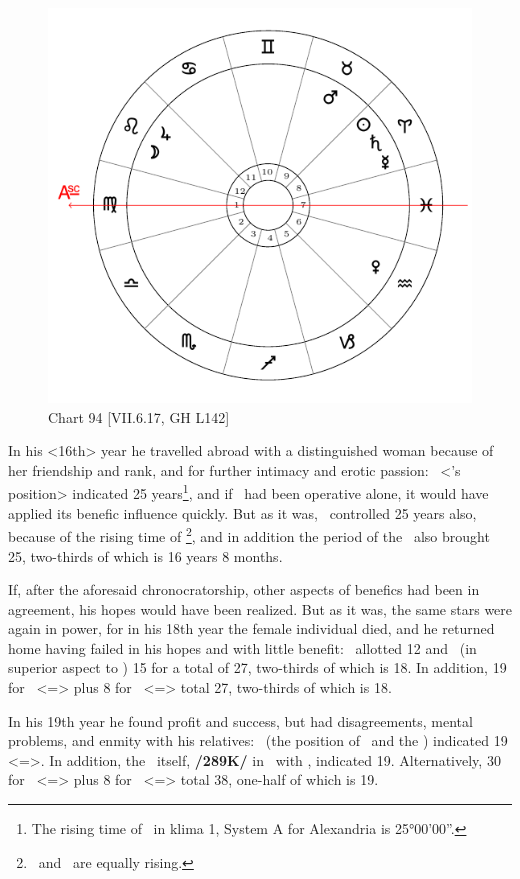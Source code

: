 \begin{figure}
\centering
\vspace{-20pt}
\includegraphics[width=.68\textwidth]{charts/7_6_17}
\caption{Chart 94 [VII.6.17, GH L142] }
\label{fig:chart94}
\end{figure} 

In his <16th> year he travelled abroad with a distinguished
woman because of her friendship and rank, and for further intimacy and erotic passion: \Aquarius\, <\Venus’s position> indicated 25 years\footnote{The rising time of \Aquarius\, in klima 1, System A for Alexandria is 25°00'00''.}, and if \Venus\, had been operative alone, it would have applied its benefic influence quickly. But as it was, \Mars\, controlled 25 years also, because of the rising time of \Taurus\footnote{\Taurus\, and \Aquarius\, are equally rising.}, and in addition the period of the \Moon\, also brought 25, two-thirds of which is 16 years 8 months. 

If, after the aforesaid chronocratorship, other aspects of benefics had been in agreement, his hopes would have been realized. But as it was, the same stars were again in power, for in his 18th year the female individual died, and he returned home having failed in his hopes and with little benefit: \Jupiter\, allotted 12 and \Mars\, (in superior aspect to \Jupiter) 15 for a total of 27, two-thirds of which is 18. In addition, 19 for \Leo\, <=\Sun> plus 8 for \Taurus\, <=\Venus> total 27, two-thirds of which is 18.

In his 19th year he found profit and success, but had disagreements, mental problems, and enmity with his relatives: \Leo\, (the position of \Jupiter\, and the \Moon) indicated 19 <=\Sun>. In addition, the \Sun\, itself, \textbf{/289K/} in \Aries\, with \Saturn, indicated 19. Alternatively, 30 for \Aquarius\, <=\Saturn> plus 8 for \Taurus\,
<=\Venus> total 38, one-half of which is 19. 

